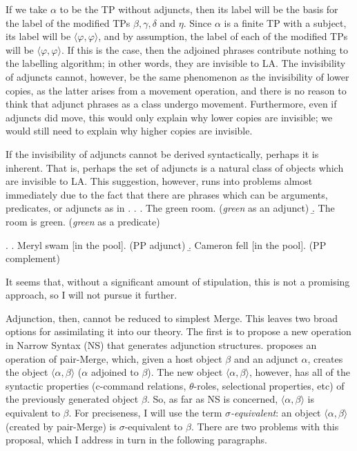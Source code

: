 \documentclass[MilwayThesis]{subfiles}
\begin{document}
If we take $\alpha$ to be the TP without adjuncts, then its label will be the basis for the label of the modified TPs $\beta, \gamma, \delta$ and $\eta$.
Since $\alpha$ is a finite TP with a subject, its label will be $\langle\varphi,\varphi\rangle$, and by assumption, the label of each of the modified TPs will be $\langle\varphi,\varphi\rangle$.
If this is the case, then the adjoined phrases contribute nothing to the labelling algorithm; in other words, they are invisible to LA.
The invisibility of adjuncts cannot, however, be the same phenomenon as the invisibility of lower copies, as the latter arises from a movement operation, and there is no reason to think that adjunct phrases as a class undergo movement.
Furthermore, even if adjuncts did move, this would only explain why lower copies are invisible; we would still need to explain why higher copies are invisible.

If the invisibility of adjuncts cannot be derived syntactically, perhaps it is inherent.
That is, perhaps the set of adjuncts is a natural class of objects which are invisible to LA.
This suggestion, however, runs into problems almost immediately due to the fact that there are phrases which can be arguments, predicates, or adjuncts as in .
\ex. \label{ex:Adjective}
\a. The green room. (\textit{green} as an adjunct)
\b. The room is green. (\textit{green} as a predicate)

\ex. \label{ex:PP} 
\a. Meryl swam [in the pool]. (PP adjunct)
\b. Cameron fell [in the pool]. (PP complement)

It seems that, without a significant amount of stipulation, this is not a promising approach, so I will not pursue it further.

Adjunction, then, cannot be reduced to simplest Merge.
This leaves two broad options for assimilating it into our theory.
The first is to propose a new operation in Narrow Syntax (NS) that generates adjunction structures.
\textcite{chomsky2004beyond} proposes an operation of pair-Merge, which, given a host object $\beta$ and an adjunct $\alpha$, creates the object $\langle\alpha,\beta\rangle$ ($\alpha$ adjoined to $\beta$).
The new object $\langle\alpha,\beta\rangle$, however, has all of the syntactic properties (c-command relations, $\theta$-roles, selectional properties, etc) of the previously generated object $\beta$.
So, as far as NS is concerned, $\langle\alpha,\beta\rangle$ is equivalent to $\beta$.
For preciseness, I will use the term $\sigma$\textit{-equivalent}: an object $\langle\alpha,\beta\rangle$ (created by pair-Merge) is $\sigma$-equivalent to $\beta$.
There are two problems with this proposal, which I address in turn in the following paragraphs.
\end{document}
